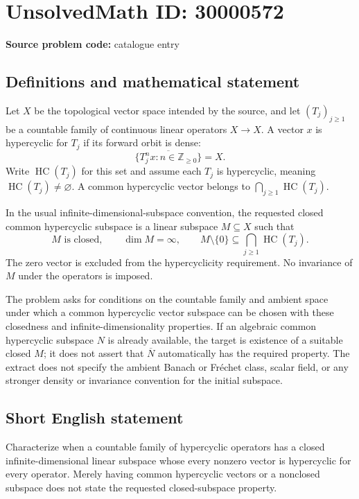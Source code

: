 \documentclass[11pt]{article}
\newcommand{\Z}{\mathbb{Z}}
\begin{document}
\section*{UnsolvedMath ID: 30000572}
\textbf{Source problem code:} catalogue entry
\subsection{Definitions and mathematical statement}
Let $X$ be the topological vector space intended by the source, and let $(T_j)_{j\geq1}$ be a countable family of continuous linear operators $X\to X$. A vector $x$ is hypercyclic for $T_j$ if its forward orbit is dense:
\[
\overline{\{T_j^n x:n\in\Z_{\geq0}\}}=X.
\]
Write $\operatorname{HC}(T_j)$ for this set and assume each $T_j$ is hypercyclic, meaning $\operatorname{HC}(T_j)\ne\varnothing$. A common hypercyclic vector belongs to $\bigcap_{j\geq1}\operatorname{HC}(T_j)$.

In the usual infinite-dimensional-subspace convention, the requested closed common hypercyclic subspace is a linear subspace $M\subseteq X$ such that
\[
M\text{ is closed},\qquad\dim M=\infty,\qquad
M\setminus\{0\}\subseteq\bigcap_{j\geq1}\operatorname{HC}(T_j).
\]
The zero vector is excluded from the hypercyclicity requirement. No invariance of $M$ under the operators is imposed.

The problem asks for conditions on the countable family and ambient space under which a common hypercyclic vector subspace can be chosen with these closedness and infinite-dimensionality properties. If an algebraic common hypercyclic subspace $N$ is already available, the target is existence of a suitable closed $M$; it does not assert that $\overline N$ automatically has the required property. The extract does not specify the ambient Banach or Fréchet class, scalar field, or any stronger density or invariance convention for the initial subspace.
\subsection{Short English statement}
Characterize when a countable family of hypercyclic operators has a closed infinite-dimensional linear subspace whose every nonzero vector is hypercyclic for every operator. Merely having common hypercyclic vectors or a nonclosed subspace does not state the requested closed-subspace property.
\end{document}

